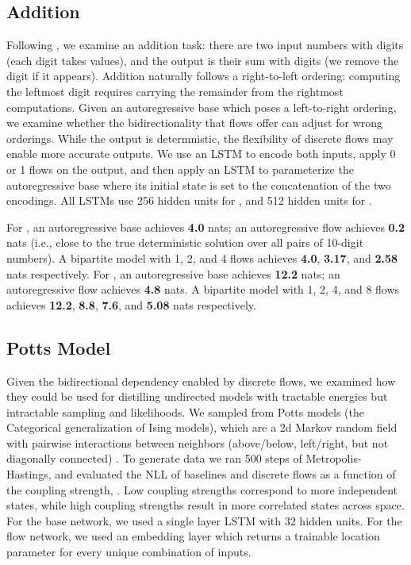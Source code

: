 \documentclass{article}
\begin{document}
\subsection{Addition}
Following \citet{zaremba2014learning}, we examine an addition task: there are two input numbers with  digits (each digit takes  values), and the output is their sum with  digits (we remove the  digit if it appears).
Addition naturally follows a right-to-left ordering: computing the leftmost digit requires carrying the remainder from the rightmost computations.
Given an autoregressive base which poses a left-to-right ordering, we examine whether the bidirectionality that flows offer can adjust for wrong orderings. While the output is determnistic, the flexibility of discrete flows may enable more accurate outputs.
We use an LSTM to encode both inputs, apply 0 or 1 flows on the output, and then apply an LSTM to parameterize the autoregressive base where its initial state is set to the concatenation of the two encodings. All LSTMs use 256 hidden units for , and 512 hidden units for .

For , an autoregressive base achieves \textbf{4.0} nats;
an autoregressive flow achieves \textbf{0.2} nats (i.e., close to the true deterministic solution over all pairs of 10-digit numbers). A bipartite model with 1, 2, and 4 flows achieves \textbf{4.0}, \textbf{3.17}, and \textbf{2.58} nats respectively.
For , an autoregressive base achieves \textbf{12.2} nats;
an autoregressive flow achieves \textbf{4.8} nats. A bipartite model with 1, 2, 4, and 8 flows achieves \textbf{12.2}, \textbf{8.8}, \textbf{7.6}, and \textbf{5.08} nats respectively.

\subsection{Potts Model}
Given the bidirectional dependency enabled by discrete flows, we examined how they could be used for distilling undirected models with tractable energies but intractable sampling and likelihoods. We sampled from Potts models (the Categorical generalization of Ising models), which are a 2d Markov random field with pairwise interactions between neighbors (above/below, left/right, but not diagonally connected) \citep{wu1982potts}. To generate data we ran 500 steps of Metropolis-Hastings, and evaluated the NLL of baselines and discrete flows as a function of the coupling strength, . Low coupling strengths correspond to more independent states, while high coupling strengths result in more correlated states across space. For the base network, we used a single layer LSTM with 32 hidden units. For the flow network, we used an embedding layer which returns a trainable location parameter for every unique combination of inputs.
\end{document}
